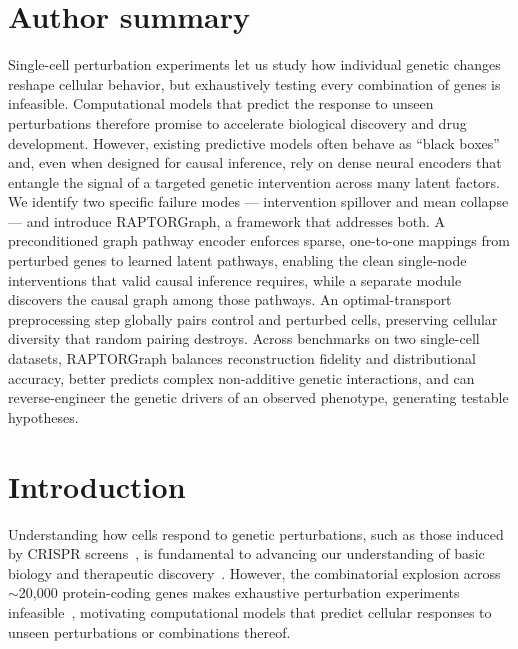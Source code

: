 \documentclass[10pt,letterpaper]{article}
\theoremstyle{definition}
\theoremstyle{remark}
\begin{document}
\section*{Author summary}
Single-cell perturbation experiments let us study how individual genetic changes reshape cellular behavior, but exhaustively testing every combination of genes is infeasible.
Computational models that predict the response to unseen perturbations therefore promise to accelerate biological discovery and drug development.
However, existing predictive models often behave as ``black boxes'' and, even when designed for causal inference, rely on dense neural encoders that entangle the signal of a targeted genetic intervention across many latent factors.
We identify two specific failure modes --- intervention spillover and mean collapse --- and introduce RAPTORGraph, a framework that addresses both.
A preconditioned graph pathway encoder enforces sparse, one-to-one mappings from perturbed genes to learned latent pathways, enabling the clean single-node interventions that valid causal inference requires, while a separate module discovers the causal graph among those pathways.
An optimal-transport preprocessing step globally pairs control and perturbed cells, preserving cellular diversity that random pairing destroys.
Across benchmarks on two single-cell datasets, RAPTORGraph balances reconstruction fidelity and distributional accuracy, better predicts complex non-additive genetic interactions, and can reverse-engineer the genetic drivers of an observed phenotype, generating testable hypotheses.

\clearpage
{}
\linenumbers


\section*{Introduction}
Understanding how cells respond to genetic perturbations, such as those induced by CRISPR screens~\cite{dixit2016perturb}, is fundamental to advancing our understanding of basic biology and therapeutic discovery~\cite{plenge2013validating,adamson2016multiplexed,norman2019exploring}.
However, the combinatorial explosion across $\sim$20{,}000 protein-coding genes makes exhaustive perturbation experiments infeasible~\cite{norman2019exploring}, motivating computational models that predict cellular responses to unseen perturbations or combinations thereof.
\end{document}
